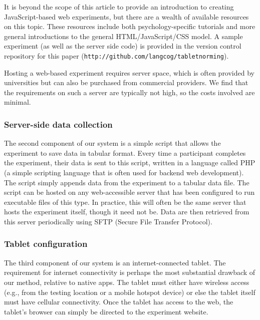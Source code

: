 \documentclass[man,noapacite]{apa2}
\begin{document}
It is beyond the scope of this article to provide an introduction to creating JavaScript-based web experiments, but there are a wealth of available resources on this topic. These resources include both psychology-specific tutorials and more general introductions to the general HTML/JavaScript/CSS model. A sample experiment (as well as the server side code) is provided in the version control repository for this paper (\texttt{http://github.com/langcog/tablet\textunderscore norming}). 

Hosting a web-based experiment requires server space, which is often provided by universities but can also be purchased from commercial providers. We find that the requirements on such a server are typically not high, so the costs involved are minimal.




\subsubsection{Server-side data collection}

The second component of our system is a simple script that allows the experiment to save data in tabular format. Every time a participant completes the experiment, their data is sent to this script, written in a language called PHP (a simple scripting language that is often used for backend web development). The script simply appends data from the experiment to a tabular data file. The script can be hosted on any web-accessible server that has been configured to run executable files of this type. In practice, this will often be the same server that hosts the experiment itself, though it need not be. Data are then retrieved from this server periodically using SFTP (Secure File Transfer Protocol). 

\subsubsection{Tablet configuration}

The third component of our system is an internet-connected tablet. The requirement for internet connectivity is perhaps the most substantial drawback of our method, relative to native apps. The tablet must either have wireless access (e.g., from the testing location or a mobile hotspot device) or else the tablet itself must have cellular connectivity. Once the tablet has access to the web, the tablet's browser can simply be directed to the experiment website. 
\end{document}
